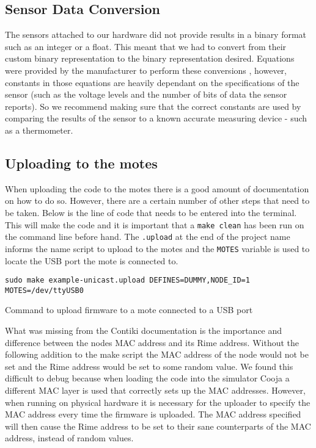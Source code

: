 \subsection{Sensor Data Conversion}

The sensors attached to our hardware did not provide results in a binary format such as an integer or a float. This meant that we had to convert from their custom binary representation to the binary representation desired. Equations were provided by the manufacturer to perform these conversions \cite{sensiriondatasheet}, however, constants in those equations are heavily dependant on the specifications of the sensor (such as the voltage levels and the number of bits of data the sensor reports). So we recommend making sure that the correct constants are used by comparing the results of the sensor to a known accurate measuring device - such as a thermometer.

\subsection{Uploading to the motes}

When uploading the code to the motes there is a good amount of documentation on how to do so. However, there are a certain number of other steps that need to be taken. Below is the line of code that needs to be entered into the terminal. This will make the code and it is important that a \verb|make clean| has been run on the command line before hand. The \verb|.upload| at the end of the project name informs the name script to upload to the motes and the \verb|MOTES| variable is used to locate the USB port the mote is connected to.

\begin{listing}
\begin{verbatim}
sudo make example-unicast.upload DEFINES=DUMMY,NODE_ID=1 MOTES=/dev/ttyUSB0
\end{verbatim}
\caption{Command to upload firmware to a mote connected to a USB port}
\end{listing}

What was missing from the Contiki documentation is the importance and difference between the nodes MAC address and its Rime address. Without the following addition to the make script the MAC address of the node would not be set and the Rime address would be set to some random value. We found this difficult to debug because when loading the code into the simulator Cooja a different MAC layer is used that correctly sets up the MAC addresses. However, when running on physical hardware it is necessary for the uploader to specify the MAC address every time the firmware is uploaded. The MAC address specified will then cause the Rime address to be set to their sane counterparts of the MAC address, instead of random values.

